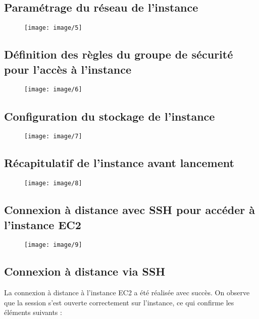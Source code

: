 \subsection{Paramétrage du réseau de l’instance}
\begin{figure}[h!]
	\centering
	\texttt{[image: image/5]}
	\label{fig:5}
\end{figure}
\newpage
\subsection{Définition des règles du groupe de sécurité pour l’accès à l’instance}
\begin{figure}[h!]
	\centering
	\texttt{[image: image/6]}
	\label{fig:6}
\end{figure}

\subsection{Configuration du stockage de l’instance}
\begin{figure}[h!]
	\centering
	\texttt{[image: image/7]}
	\label{fig:7}
\end{figure}
\newpage
\subsection{Récapitulatif de l'instance avant lancement}
\begin{figure}[h!]
	\centering
	\texttt{[image: image/8]}
	\label{fig:8}
\end{figure}

\subsection{Connexion à distance avec SSH pour accéder à l’instance EC2}
\begin{figure}[h!]
	\centering
	\texttt{[image: image/9]}
	\label{fig:9}
\end{figure}

\subsection{Connexion à distance via SSH}
La connexion à distance à l'instance EC2 a été réalisée avec succès. On observe que la session s’est ouverte correctement sur l’instance, ce qui confirme les éléments suivants :

